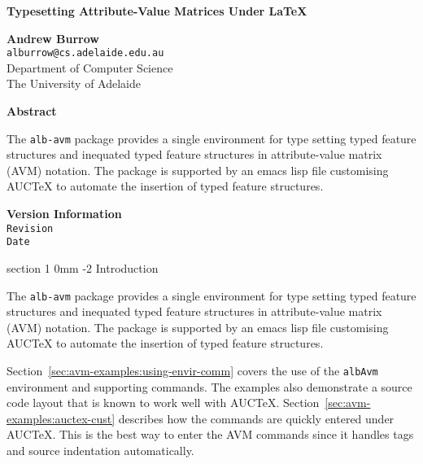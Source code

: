 \documentclass[11pt,a4paper,oneside]{article}
\makeatletter
\renewcommand{\section}{\@startsection%
  {section}%
  {1}%
  {0mm}%
  {-2\baselineskip}%
  {\baselineskip}%
  {\normalfont\sffamily\bfseries\Large}%
  }
\newcommand{\AUCTeX}[0]{AUC\TeX{}}
\newenvironment{fullwidth}[0]{%
  \begin{list}{}{%
      \setlength{\topsep}{0pt}%
      \setlength{\leftmargin}{-\marginparwidth}%
      \addtolength{\leftmargin}{-\marginparsep}%
      \setlength{\listparindent}{\parindent}%
      \setlength{\itemindent}{0pt}%
      \setlength{\parsep}{\parskip}%
      }
  \item 
  }{%
  \end{list}
  }
\makeatother
\begin{document}

\thispagestyle{plain}

\begin{fullwidth}
  \sffamily\bfseries\LARGE%
  Typesetting Attribute-Value Matrices Under \LaTeX{}%
\end{fullwidth}

\begin{list}{}{%
    \setlength{\leftmargin}{20mm}%
    \setlength{\topsep}{9mm}%
    \setlength{\itemsep}{9mm}%
    \setlength{\parsep}{0mm}%
    }

\item \textsf{\textbf{Andrew Burrow}}\\
  \texttt{alburrow@cs.adelaide.edu.au}\\
  \textsf{Department of Computer Science\\
    The University of Adelaide}
  
\item \textsf{\textbf{Abstract}}
  \begin{sloppypar}
    The \texttt{alb-avm} package provides a single environment for type
    setting typed feature structures and inequated typed feature structures
    in attribute-value matrix (AVM) notation.  The package is supported by
    an emacs lisp file customising \AUCTeX{} to automate the insertion of
    typed feature structures.
  \end{sloppypar}

\item \textsf{\textbf{Version Information}}\\
  \verb$Revision$\\
  \verb$Date$

\end{list}




\section{Introduction}
\label{sec:avm-examples:intr}

The \texttt{alb-avm} package provides a single environment for type
setting typed feature structures and inequated typed feature structures
in attribute-value matrix (AVM) notation.  The package is supported by
an emacs lisp file customising \AUCTeX{} to automate the insertion of
typed feature structures.

Section~\ref{sec:avm-examples:using-envir-comm} covers the use of the
\texttt{albAvm} environment and supporting commands.  The examples also
demonstrate a source code layout that is known to work well with
\AUCTeX{}.  Section~\ref{sec:avm-examples:auctex-cust} describes how the
commands are quickly entered under \AUCTeX{}.  This is the best way to
enter the AVM commands since it handles tags and source indentation
automatically.
\end{document}
